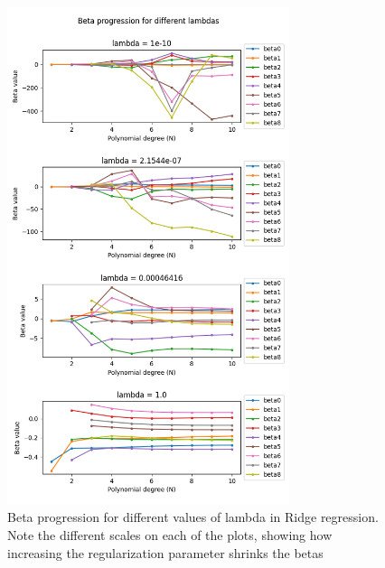 \documentclass[twocolumn,10pt,cleanfoot]{asme2ej}
\begin{document}
\begin{figure} 
\centerline{\includegraphics[width=3.25in]{figure/frankeridgebetas.png}}
\caption{Beta progression for different values of lambda in Ridge regression. Note the different scales on each of the plots, showing how increasing the regularization parameter shrinks the betas}
\label{frankeridgebetas}
\end{figure}

\end{document}
